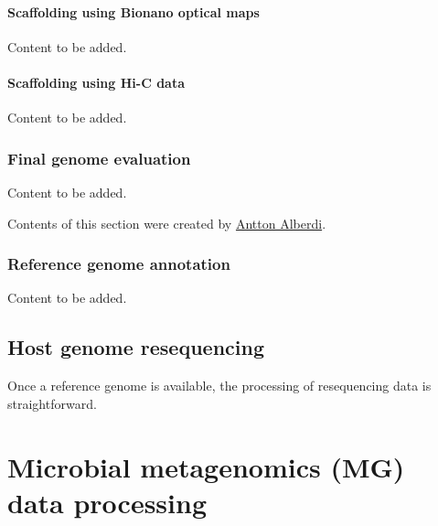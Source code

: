 \documentclass[
]{book}
\begin{document}
\hypertarget{host-genome-scaffolding-bionano}{%
\subsubsection*{Scaffolding using Bionano optical maps}\label{host-genome-scaffolding-bionano}}

Content to be added.

\hypertarget{host-genome-scaffolding-hi-c}{%
\subsubsection*{Scaffolding using Hi-C data}\label{host-genome-scaffolding-hi-c}}

Content to be added.

\hypertarget{host-genome-final-evaluation}{%
\subsection{Final genome evaluation}\label{host-genome-final-evaluation}}

Content to be added.

Contents of this section were created by \protect\hyperlink{antton-alberdi}{Antton Alberdi}.

\hypertarget{host-genome-annotation}{%
\subsection{Reference genome annotation}\label{host-genome-annotation}}

Content to be added.

\hypertarget{host-resequencing}{%
\section{Host genome resequencing}\label{host-resequencing}}

Once a reference genome is available, the processing of resequencing data is straightforward.

\hypertarget{microbial-metagenomics-data-processing}{%
\chapter{Microbial metagenomics (MG) data processing}\label{microbial-metagenomics-data-processing}}
\end{document}

